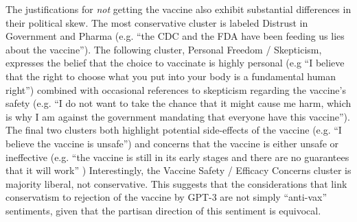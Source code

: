 \documentclass{article} %
\begin{document}
The justifications for \emph{not} getting the vaccine also exhibit
substantial differences in their political skew. The most conservative
cluster is labeled Distrust in Government and Pharma (e.g. ``the CDC and
the FDA have been feeding us lies about the vaccine''). The following
cluster, Personal Freedom / Skepticism, expresses the belief that the
choice to vaccinate is highly personal (e.g ``I believe that the right
to choose what you put into your body is a fundamental human right'')
combined with occasional references to skepticism regarding the
vaccine's safety (e.g. ``I do not want to take the chance that it might
cause me harm, which is why I am against the government mandating that
everyone have this vaccine''). The final two clusters both highlight
potential side-effects of the vaccine (e.g. ``I believe the vaccine is
unsafe'') and concerns that the vaccine is either unsafe or ineffective
(e.g. ``the vaccine is still in its early stages and there are no
guarantees that it will work'' ) Interestingly, the Vaccine Safety /
Efficacy Concerns cluster is majority liberal, not conservative. This
suggests that the considerations that link conservatism to rejection of
the vaccine by GPT-3 are not simply ``anti-vax'' sentiments, given that
the partisan direction of this sentiment is equivocal.
\end{document}
